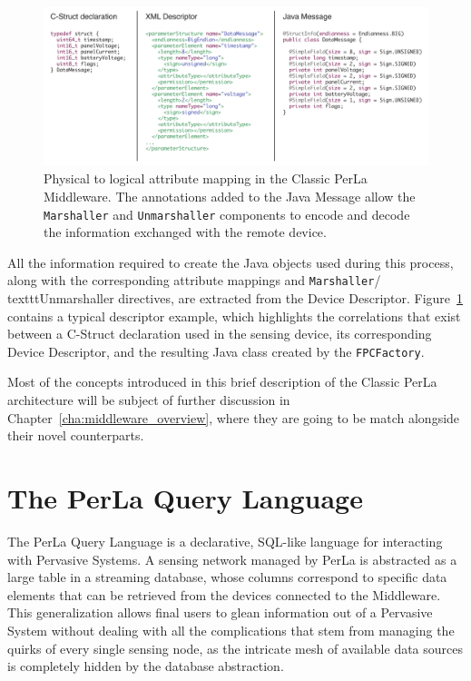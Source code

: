 \begin{figure}[h!]
\includegraphics[width=\textwidth]{imgs/classic_descriptor.pdf}
\caption{Physical to logical attribute mapping in the Classic PerLa Middleware.
The annotations added to the Java Message allow the \texttt{Marshaller} and
\texttt{Unmarshaller} components to encode and decode the information exchanged 
with the remote device.}
\label{fig:classic_descriptor}
\end{figure}

All the information required to create the Java objects used during this
process, along with the corresponding attribute mappings and
\texttt{Marshaller}/\\texttt{Unmarshaller} directives, are extracted from the
Device Descriptor. Figure~\ref{fig:classic_descriptor} contains a typical
descriptor example, which highlights the correlations that exist between a
C-Struct declaration used in the sensing device, its corresponding Device
Descriptor, and the resulting Java class created by the \texttt{FPCFactory}.

Most of the concepts introduced in this brief description of the Classic PerLa
architecture will be subject of further discussion in
Chapter~\ref{cha:middleware_overview}, where they are going to be match
alongside their novel counterparts.

\section{The PerLa Query Language}
\label{sec:language}

The PerLa Query Language is a declarative, SQL-like language for interacting
with Pervasive Systems. A sensing network managed by PerLa is abstracted as a
large table in a streaming database, whose columns correspond to specific data
elements that can be retrieved from the devices connected to the Middleware.
This generalization allows final users to glean information out of a Pervasive
System without dealing with all the complications that stem from managing the
quirks of every single sensing node, as the intricate mesh of available data
sources is completely hidden by the database abstraction.

